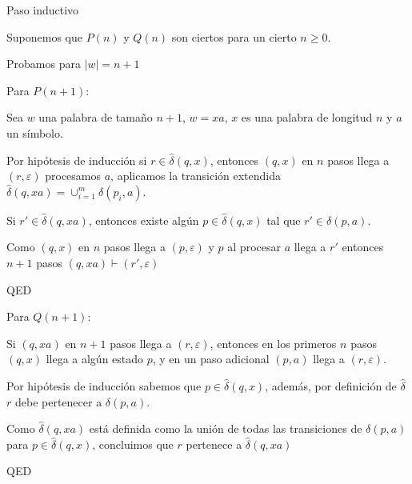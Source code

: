 \documentclass[a4paper, 12pt]{article}
\begin{document}
\vspace{0.2cm}
\par { \large \color{azul} Paso inductivo}
\par Suponemos que $P(n)$ y $Q(n)$ son ciertos para un cierto $n \geq 0$.

\vspace{0.2cm}
\par { \large \color{azul} Probamos para $|w|= n + 1$}
\par Para $P(n + 1)$:
\par Sea $w$ una palabra de tamaño $n + 1$, $w = xa$, $x$ es una palabra de longitud $n$ y $a$ un símbolo.
\par Por hipótesis de inducción si $r \in \hat{\delta}(q, x)$, entonces $(q, x)$ en $n$ pasos llega a $(r, \varepsilon)$ procesamos $a$, aplicamos la transición extendida $\hat{\delta}(q, xa) = \cup^{m}_{i = 1} \delta(p_{i}, a)$.
\newpage
\par Si $r' \in \hat{\delta}(q, xa)$, entonces existe algún $p \in \hat{\delta}(q, x)$ tal que $r' \in \delta(p, a)$.
\par Como $(q, x)$ en $n$ pasos llega a $(p, \varepsilon)$ y $p$ al procesar $a$ llega a $r'$ entonces $n + 1$ pasos $(q, xa) \vdash (r', \varepsilon)$
\vspace{0.2cm}
\par \hspace{12cm} QED

\vspace{0.4cm} Para $Q(n +1 )$:
\par Si $(q, xa)$ en $n + 1$ pasos llega a $(r, \varepsilon)$, entonces en los primeros $n$ pasos $(q, x)$ llega a algún estado $p$, y en un paso adicional $(p, a)$ llega a $(r, \varepsilon)$.
\par Por hipótesis de inducción sabemos que $p \in \hat{\delta}(q, x)$, además, por definición de $\hat{\delta}$ $r$ debe pertenecer a $\delta (p, a)$.
\par Como $\hat{\delta}(q, xa)$ está definida como la unión de todas las transiciones de $\delta(p, a)$ para $p \in \hat{\delta}(q, x)$, concluimos que $r$ pertenece a $\hat{\delta}(q, xa)$
\vspace{0.2cm}
\par \hspace{12cm} QED
\end{document}
